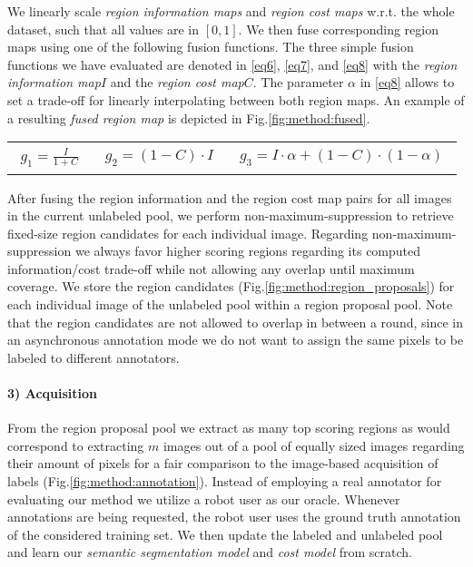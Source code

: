 \documentclass{bmvc2k}
\begin{document}
We linearly scale {\it region information maps} and {\it region cost maps} w.r.t. the whole dataset, such that all values are in $[0, 1]$. We then fuse corresponding region maps using one of the following fusion functions. The three simple fusion functions we have evaluated are denoted in \eqref{eq6}, \eqref{eq7}, and \eqref{eq8} with the \textit{region information map}$I$ and the \textit{region cost map}$C$. The parameter $\alpha$ in \eqref{eq8} allows to set a trade-off for linearly interpolating between both region maps. An example of a resulting \textit{fused region map} is depicted in Fig.\ref{fig:method:fused}.  
\vspace{-0.25cm}\begin{tabular}{p{}p{}p{}}{\begin{align}
\label{eq6}
g_1=\frac{I}{1+C}
\end{align}}
&
{\begin{align}
\label{eq7}
g_2=(1-C) \cdot I
\end{align}}
&
{\begin{align}
\label{eq8}
g_3=I \cdot\alpha+(1-C) \cdot (1-\alpha)
\end{align}}
\end{tabular}\vspace{-0.25cm}
After fusing the region information and the region cost map pairs for all images in the current unlabeled pool, we perform non-maximum-suppression to retrieve fixed-size region candidates for each individual image. Regarding non-maximum-suppression we always favor higher scoring regions regarding its computed information/cost trade-off while not allowing any overlap until maximum coverage. We store the region candidates (Fig.\ref{fig:method:region_proposals}) for each individual image of the unlabeled pool within a region proposal pool. Note that the region candidates are not allowed to overlap in between a round, since in an asynchronous annotation mode we do not want to assign the same pixels to be labeled to different annotators. 

\vspace{-0.275cm}\paragraph{3) Acquisition} From the region proposal pool we extract as many top scoring regions as would correspond to extracting $m$ images out of a pool of equally sized images regarding their amount of pixels for a fair comparison to the image-based acquisition of labels (Fig.\ref{fig:method:annotation}). Instead of employing a real annotator for evaluating our method we utilize a robot user as our oracle. Whenever annotations are being requested, the robot user uses the ground truth annotation of the considered training set. We then update the labeled and unlabeled pool and learn our \textit{semantic segmentation model} and \textit{cost model} from scratch.  
\end{document}
